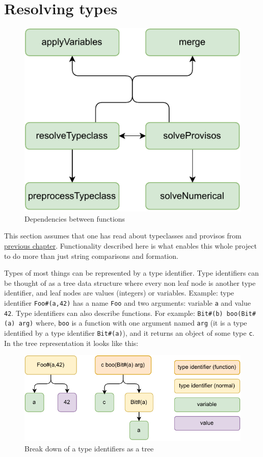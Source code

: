 \documentclass[12pt]{report}
\begin{document}
\section{Resolving types}
\begin{figure}[!h]
    \centering
    \caption{Dependencies between functions}

    \includegraphics[width=0.5\columnwidth]{pdfExports/LargeMapResolve.pdf}
\end{figure}
This section assumes that one has read about typeclasses and provisos from \hyperref[sec:Typeclasses]{previous chapter}.
Functionality described here is what enables this whole project to do more than just string comparisons and formation. 
\par
Types of most things can be represented by a type identifier.
Type identifiers can be thought of as a tree data structure where every non leaf node is another type identifier, and leaf nodes are values (integers) or variables. 
Example: type identifier \verb!Foo#(a,42)! has a name \verb!Foo! and two arguments: variable \verb!a! and value \verb!42!.
Type identifiers can also describe functions.
For example: \verb!Bit#(b) boo(Bit#(a) arg)! where, 
\verb!boo! is a function with one argument named \verb!arg! (it is a type identified by a type identifier \verb!Bit#(a)!), and it returns an object of some type \verb!c!. In the tree representation it looks like this:
\begin{figure}[H]
    \centering
    \caption{Break down of a type identifiers as a tree}
    \includegraphics[width=0.7\columnwidth]{pdfExports/LargeMap-FunctionBreakDown.drawio.pdf}
\end{figure}
\end{document}
